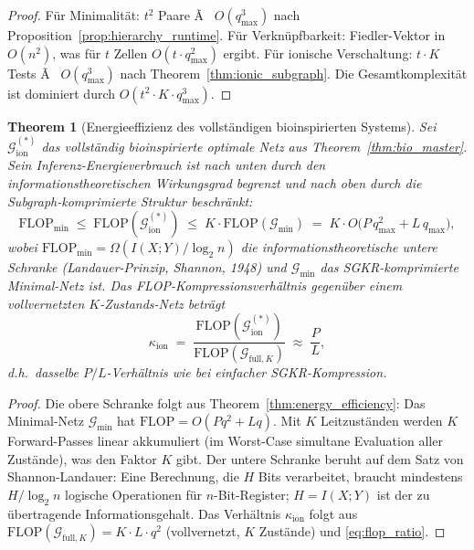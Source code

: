 ﻿\documentclass[12pt, a4paper, openany]{report}
\newtheorem{theorem}{Theorem}[chapter]
\newcommand{\calG}{\mathcal{G}}
\begin{document}
\begin{proof}
Für Minimalität: $t^2$ Paare Ã  $O(q_{\max}^3)$ nach Proposition~\ref{prop:hierarchy_runtime}.
Für Verknüpfbarkeit: Fiedler-Vektor in $O(n^2)$, was für $t$ Zellen $O(t \cdot q_{\max}^2)$ ergibt.
Für ionische Verschaltung: $t \cdot K$ Tests Ã  $O(q_{\max}^3)$ nach Theorem~\ref{thm:ionic_subgraph}.
Die Gesamtkomplexität ist dominiert durch $O(t^2 \cdot K \cdot q_{\max}^3)$.
\end{proof}

\begin{theorem}[Energieeffizienz des vollständigen bioinspirierten Systems]
\label{thm:bio_energy}
Sei $\calG_{\mathrm{ion}}^{(*)}$ das vollständig bioinspirierte optimale
Netz aus Theorem~\ref{thm:bio_master}.  Sein Inferenz-Energieverbrauch
ist nach unten durch den informationstheoretischen Wirkungsgrad begrenzt
und nach oben durch die Subgraph-komprimierte Struktur beschränkt:
\begin{equation}
  \label{eq:bio_energy_bound}
  \mathrm{FLOP}_{\min}
  \;\leq\;
  \mathrm{FLOP}(\calG_{\mathrm{ion}}^{(*)})
  \;\leq\;
  K \cdot\mathrm{FLOP}(\calG_{\min})
  \;=\;
  K \cdot O\!\bigl(P\,q_{\max}^2 + L\,q_{\max}\bigr),
\end{equation}
wobei $\mathrm{FLOP}_{\min} = \Omega(I(X;Y) / \log_2 n)$ die
informationstheoretische untere Schranke (Lan\-dauer-Prinzip, Shannon, 1948)
und $\calG_{\min}$ das SGKR-komprimierte Minimal-Netz ist.  Das
FLOP-Kompressions\-ver\-hältnis gegenüber einem vollvernetzten
$K$-Zustands-Netz beträgt
\begin{equation}
  \label{eq:bio_flop_ratio}
  \kappa_{\mathrm{ion}}
  \;=\;
  \frac{\mathrm{FLOP}(\calG_{\mathrm{ion}}^{(*)})}
       {\mathrm{FLOP}(\calG_{\mathrm{full}, K})}
  \;\approx\;
  \frac{P}{L},
\end{equation}
d.h.\ dasselbe $P/L$-Verhältnis wie bei einfacher SGKR-Kompression.
\end{theorem}

\begin{proof}
Die obere Schranke folgt aus Theorem~\ref{thm:energy_efficiency}: Das
Minimal-Netz $\calG_{\min}$ hat $\mathrm{FLOP} = O(Pq^2 + Lq)$.
Mit $K$ Leitzuständen werden $K$ Forward-Passes linear akkumuliert
(im Worst-Case simultane Evaluation aller Zustände), was den Faktor $K$ gibt.
Der untere Schranke beruht auf dem Satz von Shannon-Landauer:
Eine Berechnung, die $H$ Bits verarbeitet, braucht mindestens $H/\log_2 n$
logische Operationen für $n$-Bit-Register;
$H = I(X;Y)$ ist der zu übertragende Informationsgehalt.
Das Verhältnis $\kappa_{\mathrm{ion}}$ folgt aus $\mathrm{FLOP}(\calG_{\mathrm{full},K})
= K \cdot L \cdot q^2$ (vollvernetzt, $K$ Zustände) und \eqref{eq:flop_ratio}.
\end{proof}
\end{document}
